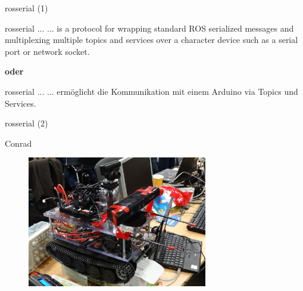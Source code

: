 \documentclass{beamer}
\begin{document}
\begin{frame}{rosserial (1)}
\begin{alertblock}{rosserial ...}
... is a protocol for wrapping standard ROS serialized messages and multiplexing multiple topics and services over a character device such as a serial port or network socket.
\end{alertblock}
\vspace{10px}
\begin{large}\textbf{oder}\end{large}
\vspace{10px}
\begin{alertblock}{rosserial ...}
... erm\"oglicht die Kommunikation mit einem Arduino via Topics und Services.
\end{alertblock}
\end{frame}
\begin{frame}{rosserial (2)}
	
\end{frame}
\begin{frame}{Conrad}
\begin{figure}[H]
	\centering
	\includegraphics[width=0.7\textwidth]{./images/robot-conrad.jpg}
\end{figure}
\end{frame}
\end{document}
